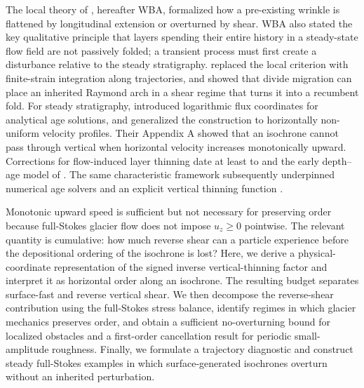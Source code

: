 \documentclass[review]{igs}
\newcommand{\parencite}{\citep}
\newcommand{\textcite}{\citet}
\theoremstyle{definition}
\theoremstyle{remark}
\begin{document}
The local theory of \textcite{Waddington2001}, hereafter WBA, formalized how a pre-existing wrinkle is flattened by longitudinal extension or overturned by shear. WBA also stated the key qualitative principle that layers spending their entire history in a steady-state flow field are not passively folded; a transient process must first create a disturbance relative to the steady stratigraphy. \textcite{JacobsonWaddington2004} replaced the local criterion with finite-strain integration along trajectories, and \textcite{JacobsonWaddington2005} showed that divide migration can place an inherited Raymond arch in a shear regime that turns it into a recumbent fold. For steady stratigraphy, \textcite{ParreninHindmarshRemy2006} introduced logarithmic flux coordinates for analytical age solutions, and \textcite{ParreninHindmarsh2007} generalized the construction to horizontally non-uniform velocity profiles. Their Appendix A showed that an isochrone cannot pass through vertical when horizontal velocity increases monotonically upward. Corrections for flow-induced layer thinning date at least to \textcite{Nye1963} and the early depth--age model of \textcite{DansgaardJohnsen1969}. The same characteristic framework subsequently underpinned numerical age solvers \parencite{HindmarshLeysingerVieliParrenin2009,ParreninChungMartin2025} and an explicit vertical thinning function \parencite{Parrenin2013,ParreninChungMartin2025}.

Monotonic upward speed is sufficient but not necessary for preserving order because full-Stokes glacier flow does not impose \(u_z\geq0\) pointwise. The relevant quantity is cumulative: how much reverse shear can a particle experience before the depositional ordering of the isochrone is lost? Here, we derive a physical-coordinate representation of the signed inverse vertical-thinning factor and interpret it as horizontal order along an isochrone. The resulting budget separates surface-fast and reverse vertical shear. We then decompose the reverse-shear contribution using the full-Stokes stress balance, identify regimes in which glacier mechanics preserves order, and obtain a sufficient no-overturning bound for localized obstacles and a first-order cancellation result for periodic small-amplitude roughness. Finally, we formulate a trajectory diagnostic and construct steady full-Stokes examples in which surface-generated isochrones overturn without an inherited perturbation.
\end{document}
